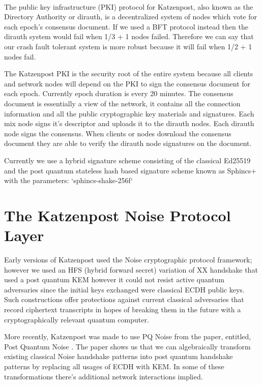 \documentclass{article}
\begin{document}
\paragraph{}The public key infrastructure (PKI) protocol for Katzenpost, also known
as the Directory Authority or dirauth, is a decentralized system of nodes
which vote for each epoch's consensus document. If we used a BFT protocol instead
then the dirauth system would fail when 1/3 + 1 nodes failed. Therefore we can
say that our crash fault tolerant system is more robust because it will fail
when 1/2 + 1 nodes fail.

The Katzenpost PKI is the security root of the entire system because all clients
and network nodes will depend on the PKI to sign the consensus document for each epoch.
Currently epoch duration is every 20 minutes. The consensus document is essentially a view of
the network, it contains all the connection information and all the public cryptographic key materials
and signatures. Each mix node signs it's descriptor and uploads it to the dirauth nodes. Each dirauth
node signs the consensus. When clients or nodes download the consensus document they are able to verify
the dirauth node signatures on the document.

Currently we use a hybrid signature scheme consisting of the classical Ed25519 and the
post quantum stateless hash based signature scheme known as Sphincs+ with the parameters: `sphincs-shake-256f`

\pagebreak

\section{The Katzenpost Noise Protocol Layer}

Early versions of Katzenpost used the Noise cryptographic protocol framework; however we used
an HFS (hybrid forward secret) variation of XX handshake that used a post quantum KEM however it could not resist active quantum adversaries since the initial keys exchanged were classical ECDH public keys. Such constructions offer protections against current classical adversaries that record ciphertext transcripts in hopes of breaking them in the future with a cryptographically relevant quantum computer.

More recently, Katzenpost was made to use PQ Noise from the paper, entitled, Post Quantum Noise .
The paper shows us that we can algebraically transform existing classical Noise handshake patterns into post quantum handshake 
patterns by replacing all usages of ECDH with KEM. In some of these transformations there's additional network interactions implied.
\end{document}
